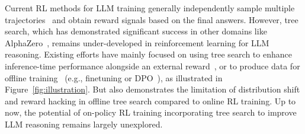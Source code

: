 




Current RL methods for LLM training generally independently sample multiple trajectories~\cite{shao2024deepseekmath,wang2024mathshepherd,touvron2023llama2} and obtain reward signals based on the final answers. 
However, tree search, which has demonstrated significant success in other domains like AlphaZero~\cite{silver2017mastering}, remains under-developed in reinforcement learning for LLM reasoning. 
Existing efforts have mainly focused on using tree search to enhance inference-time performance alongside an external reward~\cite{zhang2024rest, chen2024alphamath}, or to produce data for offline training~\cite{chen2024alphamath,xie2024monte,zhang2024rest} (e.g., finetuning or DPO~\cite{rafailov2023direct}), as illustrated in Figure~\ref{fig:illustration}. But \citet{guo2025deepseek} also demonstrates the limitation of distribution shift and reward hacking in offline tree search compared to online RL training. Up to now, the potential of on-policy RL training incorporating tree search to improve LLM reasoning remains largely unexplored.



